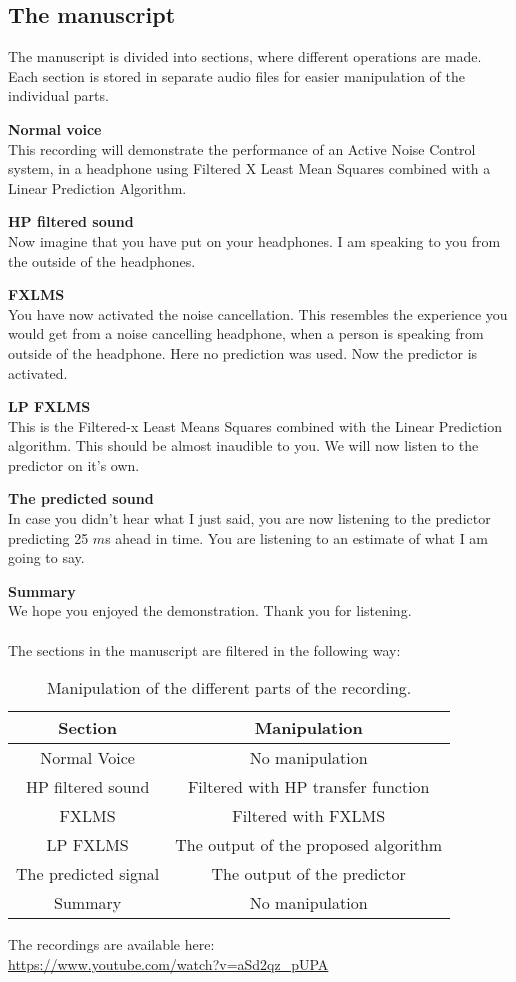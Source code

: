 \subsection{The manuscript}
The manuscript is divided into sections, where different operations are made. Each section is stored in separate audio files for easier manipulation of the individual parts. 
 
\textbf{Normal voice}\\
This recording will demonstrate the performance of an Active Noise Control  system, in a headphone using Filtered X Least Mean Squares combined with a Linear Prediction Algorithm. 

\textbf{HP filtered sound}\\
Now imagine that you have put on your headphones. I am speaking to you from the outside of the headphones.

\textbf{FXLMS}\\
You have now activated the noise cancellation. This resembles the experience you would get from a noise cancelling headphone, when a person is speaking from outside of the headphone. 
Here no prediction was used. Now the predictor is activated. 

\textbf{LP FXLMS}\\
This is the Filtered-x Least Means Squares combined with the Linear Prediction algorithm. This should be almost inaudible to you. We will now listen to the predictor on it's own. 

\textbf{The predicted sound}\\
In case you didn't hear what I just said, you are now listening to the predictor predicting 25 $m$s ahead in time. You are listening to an estimate of what I am going to say.  

\textbf{Summary}\\
We hope you enjoyed the demonstration. Thank you for listening.\\\\

The sections in the manuscript are filtered in the following way:
\begin{table}[H]
	\centering
	\begin{tabular}{ c c } \toprule
		{Section}				& {Manipulation} \\ \bottomrule 
		Normal Voice			& No manipulation  	\\
		HP filtered sound		& Filtered with HP transfer function \\
		FXLMS					& Filtered with FXLMS	\\
		LP FXLMS 				& The output of the proposed algorithm	\\
		The predicted signal 	& The output of the predictor	\\
		Summary 				& No manipulation	\\
		\bottomrule
	\end{tabular}
	\caption{Manipulation of the different parts of the recording.}
	\label{tab:VoiceRecSections}
\end{table}

The recordings are available here: \\
\url{https://www.youtube.com/watch?v=aSd2qz_pUPA} 














